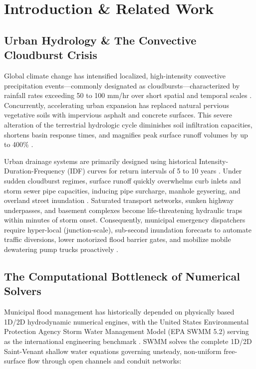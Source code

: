 \documentclass[conference]{IEEEtran}
\begin{document}
\section{Introduction \& Related Work}

\subsection{Urban Hydrology \& The Convective Cloudburst Crisis}
Global climate change has intensified localized, high-intensity convective precipitation events---commonly designated as cloudbursts---characterized by rainfall rates exceeding 50 to 100 mm/hr over short spatial and temporal scales \cite{mishra2018, groisman2012}. Concurrently, accelerating urban expansion has replaced natural pervious vegetative soils with impervious asphalt and concrete surfaces. This severe alteration of the terrestrial hydrologic cycle diminishes soil infiltration capacities, shortens basin response times, and magnifies peak surface runoff volumes by up to 400\% \cite{walsh2005}.

Urban drainage systems are primarily designed using historical Intensity-Duration-Frequency (IDF) curves for return intervals of 5 to 10 years \cite{chow1988}. Under sudden cloudburst regimes, surface runoff quickly overwhelms curb inlets and storm sewer pipe capacities, inducing pipe surcharge, manhole geysering, and overland street inundation \cite{arnold1998}. Saturated transport networks, sunken highway underpasses, and basement complexes become life-threatening hydraulic traps within minutes of storm onset. Consequently, municipal emergency dispatchers require hyper-local (junction-scale), sub-second inundation forecasts to automate traffic diversions, lower motorized flood barrier gates, and mobilize mobile dewatering pump trucks proactively \cite{beck1987}.

\subsection{The Computational Bottleneck of Numerical Solvers}
Municipal flood management has historically depended on physically based 1D/2D hydrodynamic numerical engines, with the United States Environmental Protection Agency Storm Water Management Model (EPA SWMM 5.2) serving as the international engineering benchmark \cite{rossman2015}. SWMM solves the complete 1D/2D Saint-Venant shallow water equations governing unsteady, non-uniform free-surface flow through open channels and conduit networks:
\end{document}
